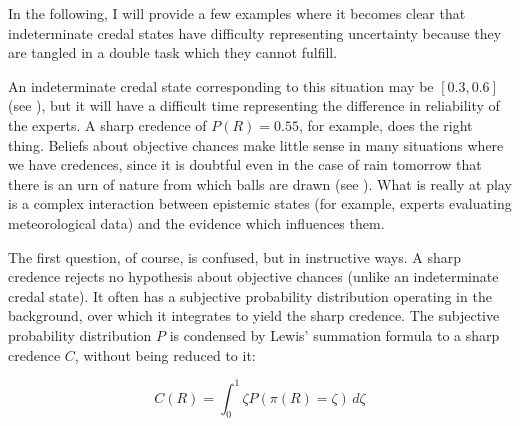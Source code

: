 \documentclass[11pt]{article}
\begin{document}
In the following, I will provide a few examples where it becomes clear
that indeterminate credal states have difficulty representing
uncertainty because they are tangled in a double task which they
cannot fulfill.


An indeterminate credal state corresponding to this situation may be
$[0.3,0.6]$ (see ), but it will have a
difficult time representing the difference in reliability of the
experts. A sharp credence of $P(R)=0.55$, for example, does the right
thing. Beliefs about objective chances make little sense in many
situations where we have credences, since it is doubtful even in the
case of rain tomorrow that there is an urn of nature from which balls
are drawn (see ). What is really at play is a
complex interaction between epistemic states (for example, experts
evaluating meteorological data) and the evidence which influences
them.


The first question, of course, is confused, but in instructive ways. A
sharp credence rejects no hypothesis about objective chances (unlike
an indeterminate credal state). It often has a subjective probability
distribution operating in the background, over which it integrates to
yield the sharp credence. The subjective probability distribution $P$
is condensed by Lewis' summation formula to a sharp credence $C$,
without being reduced to it:

\begin{equation}
  \label{eq:s2}
  C(R)=\int_{0}^{1}\zeta{}P(\pi(R)=\zeta)\,d\zeta
\end{equation}
\end{document}
